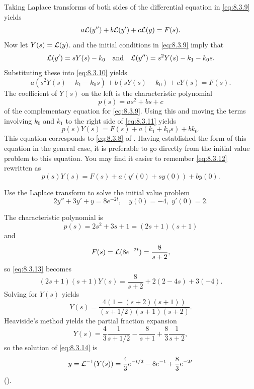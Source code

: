 Taking Laplace transforms of both sides of  the differential
equation in \eqref{eq:8.3.9} yields
\begin{equation}\label{eq:8.3.10}
a{\mathcal L}(y'')+b{\mathcal L}(y')+c{\mathcal L}(y)=F(s).
\end{equation}
Now let $Y(s)={\mathcal L}(y)$.   and the
initial conditions in \eqref{eq:8.3.9} imply that
\[
{\mathcal L}(y')=sY(s)-k_0\quad\text{and}\quad  {\mathcal L}(y'')=s^2Y(s)-k_1-k_0s.
\]
Substituting these  into  \eqref{eq:8.3.10} yields
\begin{equation}\label{eq:8.3.11}
a\left(s^2Y(s)-k_1-k_0s\right)+b\left(sY(s)-k_0\right)+cY(s)=F(s).
\end{equation}
The coefficient of $Y(s)$ on the left is the characteristic
polynomial
\[
p(s)=as^2+bs+c
\]
of the complementary equation for \eqref{eq:8.3.9}. Using this and moving
the terms involving $k_0$ and $k_1$ to the right side of \eqref{eq:8.3.11}
yields
\begin{equation}\label{eq:8.3.12}
p(s)Y(s)=F(s)+a(k_1+k_0s)+bk_0.
\end{equation}
This equation corresponds to \eqref{eq:8.3.8} of .
Having established the form of this equation in the general case, it
is preferable to go directly from the initial value problem to this
equation. You may find it easier to remember \eqref{eq:8.3.12} rewritten
as
\begin{equation} \label{eq:8.3.13}
p(s)Y(s)=F(s)+a\left(y'(0)+sy(0)\right)+by(0).
\end{equation}

\begin{example}\label{example:8.3.3}
 Use the Laplace transform to solve the
initial value problem
\begin{equation}\label{eq:8.3.14}
2y''+3y'+y=8e^{-2t}, \quad   y(0)=-4,\;  y'(0)=2.
\end{equation}
\end{example}

\begin{solution}
The characteristic polynomial is
\[
p(s)=2s^2+3s+1=(2s+1)(s+1)
\]
 and
\[
F(s)={\mathcal L}(8e^{-2t})=\frac{8}{s+2},
\]
so \eqref{eq:8.3.13} becomes
\[
(2s+1)(s+1)Y(s)=\frac{8}{s+2}+2(2-4s)+3(-4).
\]
Solving  for $Y(s)$ yields
\[
Y(s)=\frac{4\left(1-(s+2)(s+1)\right)}{(s+1/2)(s+1)(s+2)}.
\]
Heaviside's method yields the partial fraction expansion
\[
Y(s)=\frac{4}{3}\frac{1}{s+1/2}-\frac{8}{s+1}+\frac{8}{3}\frac{1}{s+2},
\]
so the solution of  \eqref{eq:8.3.14} is
\[
y={\mathcal L}^{-1}(Y(s))=\frac{4}{3}e^{-t/2}-8e^{-t}+\frac{8}{3}e^{-2t}
\]
().
\end{solution}

